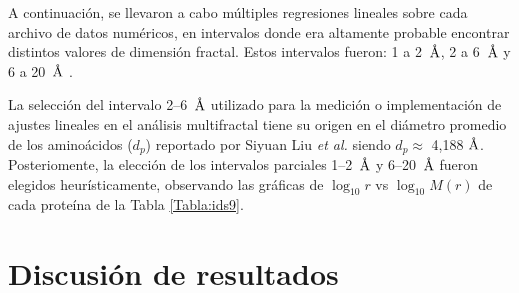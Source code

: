 	A continuaci\'{o}n, se llevaron a cabo m\'{u}ltiples regresiones lineales sobre cada archivo de datos num\'{e}ricos, en intervalos donde era altamente probable encontrar distintos valores de dimensi\'{o}n fractal. Estos intervalos fueron: 1 a 2~$\textup{\r{A}}$, 2 a 6~$\textup{\r{A}}$ y 6 a 20~$\textup{\r{A}}$ \cite{Enright2005, Liu2020}.	
	
	
	
	La selecci\'on del intervalo 2--6~$\textup{\r{A}}$ utilizado para la medici\'on o implementaci\'on de ajustes lineales en el an\'alisis multifractal tiene su origen en el di\'ametro promedio de los amino\'acidos ($d_p$) reportado por Siyuan Liu \textit{et al.} \cite{Liu2020} siendo $d_p \approx$ 4,188 $\textup{\r{A}}$. Posteriomente, la elecci\'{o}n de los intervalos parciales 1--2~$\textup{\r{A}}$ y 6--20~$\textup{\r{A}}$ fueron elegidos heur\'{i}sticamente, observando las gr\'{a}ficas de $\log_{10}r$ vs $\log_{10}M(r)$ de cada prote\'{i}na de la Tabla \ref{Tabla:ids9}.
	
	\section{Discusi\'{o}n de resultados}	
	\label{sec:disresult}
	
